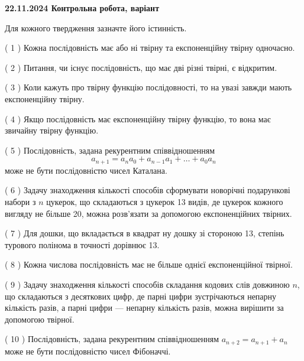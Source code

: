 \documentclass[12pt, ukrainian]{article}
\begin{document}
\vspace{4mm}
\newpage
\begin {large}

\textbf{22.11.2024 Контрольна робота, варіант  }\par


{
Для кожного твердження зазначте його істинність.\par
\vspace{2mm}
( 1 ) Кожна послідовність має або ні твірну та експоненційну твірну одночасно.%

( 2 ) Питання, чи існує послідовність, що має дві різні твірні, є відкритим.%

( 3 ) Коли кажуть про твірну функцію послідовності, то на увазі завжди мають експоненційну твірну.%

( 4 ) Якщо послідовність має експоненційну твірну функцію, то вона має звичайну твірну функцію.%

( 5 ) Послідовність, задана рекурентним співвідношенням $$a_{n+1}=a_{n}a_{0}+a_{n-1}a_{1}+\ldots+a_0a_{n}$$ може не бути послідовністю чисел Каталана.%

( 6 ) Задачу знаходження кількості способів сформувати новорічні подарункові набори з $n$ цукерок, що складаються з цукерок 13 видів, де цукерок кожного вигляду не більше 20, можна розв’язати за допомогою експоненційних твірних.%

( 7 ) Для дошки, що вкладається в квадрат ну дошку зі стороною 13, степінь турового полінома в точності дорівнює 13.%

( 8 ) Кожна числова послідовність має не більше однієї  експоненційної твірної.%

( 9 ) Задачу знаходження кількості способів складання кодових слів довжиною $n$, що складаються з десяткових цифр, де парні цифри зустрічаються непарну кількість разів, а парні цифри — непарну кількість разів, можна вирішити за допомогою твірної.%

( 10 ) Послідовність, задана рекурентним співвідношенням $a_{n+2}=a_{n+1}+a_{n}$ може не бути послідовністю чисел Фібоначчі.%


\vspace{5mm}
}
\end {large}
\end{document}
